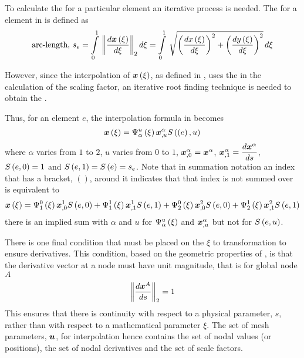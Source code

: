 To calculate the \arclen for a particular element an iterative process is
needed. The \arclen for a \onedal element in \twods is defined as
\begin{equation}
  \text{\arclen, }s_{e}=\gint{0}{1}{\norm{\dby{\fnof{\vect{x}}{\xi}}{\xi}}}
  {\xi}=\gint{0}{1}{\sqrt{\pbrac{\dby{\fnof{x}{\xi}}{\xi}}^{2}+
      \pbrac{\dby{\fnof{y}{\xi}}{\xi}}^{2}}}{\xi}
  \label{eqn:arclendef}
\end{equation}

However, since the interpolation of $\fnof{\vect{x}}{\xi}$, as defined in
, uses the \arclen in the calculation of the
scaling factor, an iterative root finding technique is needed to obtain the
\arclen.

Thus, for an element $e$, the \onedal \cubicherm interpolation
formula in  becomes
\begin{equation}
  \fnof{\vect{x}}{\xi}=\chbfn{\alpha}{u}{\xi}\nodept{\vect{x}}{\alpha}_{,u}
  \esftwo{\pbrac{e}}{u}
  \label{eqn:chsfinterpolation}
\end{equation}
where $\alpha$ varies from $1$ to $2$, $u$ varies from $0$ to $1$,
$\nodept{\vect{x}}{\alpha}_{,0}=\nodept{\vect{x}}{\alpha}$,
$\nodept{\vect{x}}{\alpha}_{,1}= \dby{\nodept{\vect{x}}{\alpha}}{s}$,
$   S \left( e,0 \right)  =1$ and $   S \left( e,1 \right)  =   S \left( {e} \right)  =s_{e}$. Note that in summation
notation an index that has a bracket, $()$, around it indicates that that
index is not summed over \eg {} is equivalent to
\begin{equation}
  \fnof{\vect{x}}{\xi}=\chbfn{1}{0}{\xi}\nodept{\vect{x}}{1}_{,0}\esftwo{e}{0}
  +\chbfn{1}{1}{\xi}\nodept{\vect{x}}{1}_{,1}\esftwo{e}{1}+
  \chbfn{2}{0}{\xi}\nodept{\vect{x}}{2}_{,0}\esftwo{e}{0}
  +\chbfn{2}{1}{\xi}\nodept{\vect{x}}{2}_{,1}\esftwo{e}{1}
\end{equation}
\ie there is an implied sum with $\alpha$ and $u$ for $   \Psi_{\alpha}^{u} \left( \xi \right)  $
and $\nodept{\vect{x}}{\alpha}_{,u}$ but not for $   S \left( e,u \right)  $.

There is one final condition that must be placed on the $\xi$ to \arclen
transformation to ensure \arclen derivatives. This condition, based on the
geometric properties of \arclens, is that the \arclen derivative vector at a
node must have unit magnitude, that is for global node $A$
\begin{equation}
  \norm{\dby{\nodept{\vect{x}}{A}}{s}}=1
  \label{eqn:chnormconstraint}
\end{equation}
This ensures that there is continuity with respect to a physical parameter,
$s$, rather than with respect to a mathematical parameter $\xi$. The set of
mesh parameters, $\vect{u}$, for \cubicherm interpolation hence contains the
set of nodal values (or positions), the set of nodal \arclen derivatives and
the set of scale factors.

